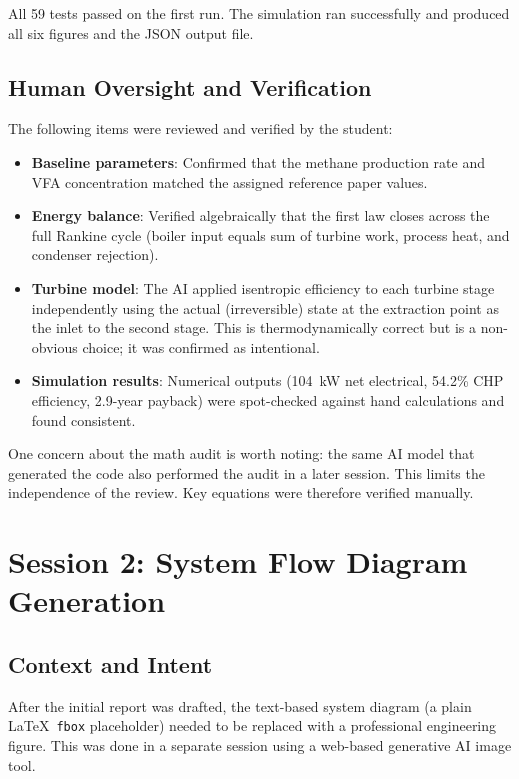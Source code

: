 \documentclass[12pt, letterpaper]{article}
\begin{document}
All 59 tests passed on the first run. The simulation ran successfully and produced all six figures and the JSON output file.

\subsection{Human Oversight and Verification}

The following items were reviewed and verified by the student:

\begin{itemize}[noitemsep]
    \item \textbf{Baseline parameters}: Confirmed that the methane production rate and VFA concentration matched the assigned reference paper values.
    \item \textbf{Energy balance}: Verified algebraically that the first law closes across the full Rankine cycle (boiler input equals sum of turbine work, process heat, and condenser rejection).
    \item \textbf{Turbine model}: The AI applied isentropic efficiency to each turbine stage independently using the actual (irreversible) state at the extraction point as the inlet to the second stage. This is thermodynamically correct but is a non-obvious choice; it was confirmed as intentional.
    \item \textbf{Simulation results}: Numerical outputs (104~kW net electrical, 54.2\% CHP efficiency, 2.9-year payback) were spot-checked against hand calculations and found consistent.
\end{itemize}

One concern about the math audit is worth noting: the same AI model that generated the code also performed the audit in a later session. This limits the independence of the review. Key equations were therefore verified manually.

\section{Session 2: System Flow Diagram Generation}

\subsection{Context and Intent}

After the initial report was drafted, the text-based system diagram (a plain \LaTeX\ \texttt{fbox} placeholder) needed to be replaced with a professional engineering figure. This was done in a separate session using a web-based generative AI image tool.
\end{document}
